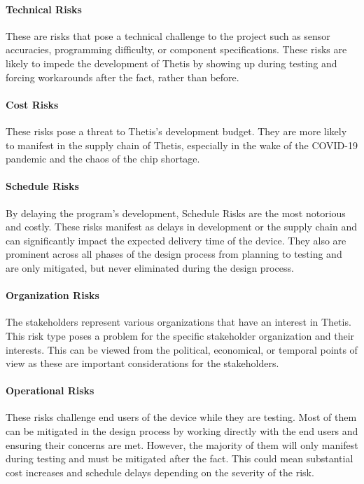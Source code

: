 \paragraph*{Technical Risks} These are risks that pose a technical challenge to the project such as sensor accuracies, programming difficulty, or component specifications. 
These risks are likely to impede the development of Thetis by showing up during testing and forcing workarounds after the fact, rather than before.

\paragraph*{Cost Risks} These risks pose a threat to Thetis's development budget.
They are more likely to manifest in the supply chain of Thetis, especially in the wake of the COVID-19 pandemic and the chaos of the chip shortage.

\paragraph*{Schedule Risks} By delaying the program's development, Schedule Risks are the most notorious and costly.
These risks manifest as delays in development or the supply chain and can significantly impact the expected delivery time of the device.
They also are prominent across all phases of the design process from planning to testing and are only mitigated, but never eliminated during the design process.

\paragraph*{Organization Risks} The stakeholders represent various organizations that have an interest in Thetis.
This risk type poses a problem for the specific stakeholder organization and their interests.
This can be viewed from the political, economical, or temporal points of view as these are important considerations for the stakeholders.

\paragraph*{Operational Risks} These risks challenge end users of the device while they are testing.
Most of them can be mitigated in the design process by working directly with the end users and ensuring their concerns are met.
However, the majority of them will only manifest during testing and must be mitigated after the fact.
This could mean substantial cost increases and schedule delays depending on the severity of the risk.

